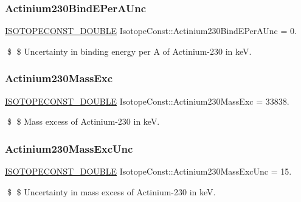 \subsubsection{\texorpdfstring{Actinium230\+Bind\+E\+Per\+A\+Unc}{Actinium230BindEPerAUnc}}
{\footnotesize\ttfamily \mbox{\hyperlink{group___isotope_const-_macros_ga8f45a7272ce02c0b4c65c44636ed719a}{I\+S\+O\+T\+O\+P\+E\+C\+O\+N\+S\+T\+\_\+\+D\+O\+U\+B\+LE}} Isotope\+Const\+::\+Actinium230\+Bind\+E\+Per\+A\+Unc = 0.}

\$ \$ Uncertainty in binding energy per A of Actinium-\/230 in keV. \mbox{\label{group___isotope_const-_actinium-_ac230_ga90cbf56524f4c7becbd623c8b442ccb6}} 
\subsubsection{\texorpdfstring{Actinium230\+Mass\+Exc}{Actinium230MassExc}}
{\footnotesize\ttfamily \mbox{\hyperlink{group___isotope_const-_macros_ga8f45a7272ce02c0b4c65c44636ed719a}{I\+S\+O\+T\+O\+P\+E\+C\+O\+N\+S\+T\+\_\+\+D\+O\+U\+B\+LE}} Isotope\+Const\+::\+Actinium230\+Mass\+Exc = 33838.}

\$ \$ Mass excess of Actinium-\/230 in keV. \mbox{\label{group___isotope_const-_actinium-_ac230_ga2c5a4a922bc5898b15ea022f514575d1}} 
\subsubsection{\texorpdfstring{Actinium230\+Mass\+Exc\+Unc}{Actinium230MassExcUnc}}
{\footnotesize\ttfamily \mbox{\hyperlink{group___isotope_const-_macros_ga8f45a7272ce02c0b4c65c44636ed719a}{I\+S\+O\+T\+O\+P\+E\+C\+O\+N\+S\+T\+\_\+\+D\+O\+U\+B\+LE}} Isotope\+Const\+::\+Actinium230\+Mass\+Exc\+Unc = 15.}

\$ \$ Uncertainty in mass excess of Actinium-\/230 in keV. \mbox{\label{group___isotope_const-_actinium-_ac230_ga7d3bb99548c7df16cb7c3271fcae2ca0}} 
